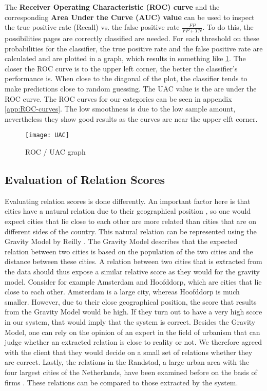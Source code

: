 The \textbf{Receiver Operating Characteristic (ROC) curve} and the corresponding \textbf{Area Under the Curve (AUC) value} can be used to inspect the true positive rate (Recall) vs. the false positive rate $\frac{FP}{FP + TN}$. To do this, the possibilities pages are correctly classified are needed. For each threshold on these probabilities for the classifier, the true positive rate and the false positive rate are calculated and are plotted in a graph, which results in something like \ref{fig:UAC}. The closer the ROC curve is to the upper left corner, the better the classifier's performance is. When close to the diagonal of the plot, the classifier tends to make predictions close to random guessing. The UAC value is the are under the ROC curve. The ROC curves for our categories can be seen in appendix \ref{app:ROC-curves}. The low smoothness is due to the low sample amount, nevertheless they show good results as the curves are near the upper elft corner.


\begin{figure}[ht]
\centering
\texttt{[image: UAC]}
\caption{ROC / UAC graph \protect\footnotemark{}}
\label{fig:UAC}
\end{figure}

\subsection{Evaluation of Relation Scores} \label{sec:validation_protocol}
Evaluating relation scores is done differently. An important factor here is that cities have a natural relation due to their geographical position \cite{tobler1970computer}, so one would expect cities that lie close to each other are more related than cities that are on different sides of the country. This natural relation can be represented using the Gravity Model by Reilly \cite{reilly1931law}. The Gravity Model describes that the expected relation between two cities is based on the population of the two cities and the distance between these cities. A relation between two cities that is extracted from the data should thus expose a similar relative score as they would for the gravity model. Consider for example Amsterdam and Hoofddorp, which are cities that lie close to each other. Amsterdam is a large city, whereas Hoofddorp is much smaller. However, due to their close geographical position, the score that results from the Gravity Model would be high. If they turn out to have a very high score in our system, that would imply that the system is correct. Besides the Gravity Model, one can rely on the opinion of an expert in the field of urbanism that can judge whether an extracted relation is close to reality or not. We therefore agreed with the client that they would decide on a small set of relations whether they are correct. Lastly, the relations in the Randstad, a large urban area with the four largest cities of the Netherlands, have been examined before on the basis of firms \cite{van2010economic}. These relations can be compared to those extracted by the system.

